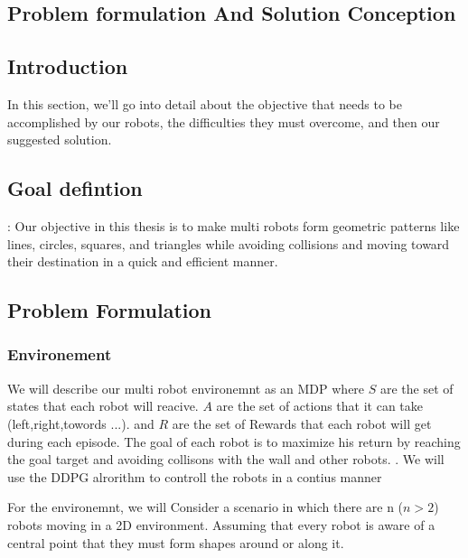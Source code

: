 \documentclass[12pt]{article}
\begin{document}
  
  
\newpage
\pagebreak
\hspace{0pt}
\vfill
\begin{center}
\section{Problem formulation And Solution Conception }
\end{center}
\vfill
\hspace{0pt}

\pagebreak

 

\subsection{Introduction}
 In this section, we'll go into  detail about the objective that needs to be accomplished by our robots, the difficulties they must overcome, and then our suggested solution.
 
\subsection{Goal defintion}:
Our objective in this thesis is to make multi robots  form geometric patterns like lines, circles, squares, and triangles while avoiding collisions and moving toward their destination in a quick and efficient manner. 



\subsection{Problem Formulation}
 

\subsubsection{Environement}

We will describe our multi robot environemnt as an MDP where $S$ are the set of states that each robot will reacive. $A$ are the set of actions that it can take (left,right,towords ...). and $R$ are the set of Rewards that each robot will get during each episode.
The  goal of each robot is to  maximize his return by reaching the goal target and avoiding collisons with the wall and other  robots.
.
We will use the DDPG alrorithm to controll the robots in a contius manner




For the environemnt, we will Consider a scenario in which there are n ($n >  2$) robots moving in a 2D environment. Assuming that every robot is aware of a central point that they must form shapes around or along it.
\end{document}
